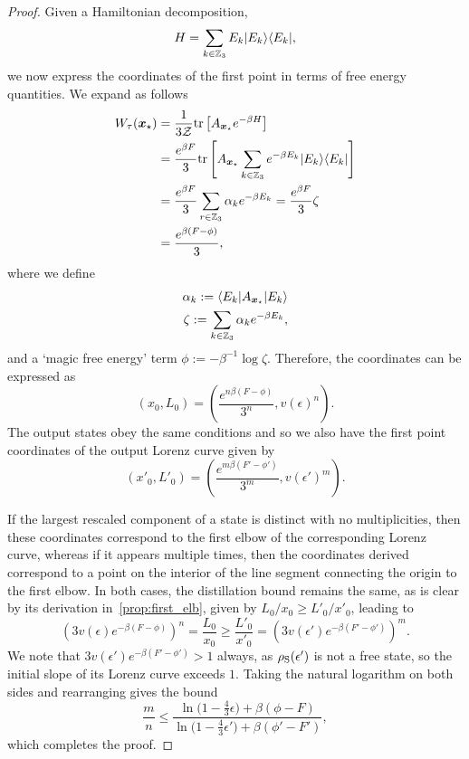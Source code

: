 \documentclass[pra,
aps,
twocolumn,
superscriptaddress,
groupedaddress,
nofootinbib,
reprint
]{revtex4-1}
\begin{document}
\begin{proof}
Given a Hamiltonian decomposition,
\begin{equation}
	H = \sum_{k \in \mathbb{Z}_3} E_k |E_k\rangle\langle E_k|,
\end{equation}
we now express the coordinates of the first point in terms of free energy quantities. We expand as follows
\begin{align}
	W_{\tau}(\boldsymbol{x}_\star) &= \frac{1}{3\mathcal{Z}}\mbox{tr}\left[ A_{\boldsymbol{x}_\star}e^{-\beta H} \right] \nonumber\\
	&= \frac{e^{\beta F}}{3} \mbox{tr}\left[ A_{\boldsymbol{x}_\star}\sum_{k \in \mathbb{Z}_3} e^{-\beta E_k} |E_k\rangle\langle E_k| \right] \\
	&= \frac{e^{\beta F}}{3} \sum_{r \in \mathbb{Z}_3} \alpha_k e^{-\beta E_k}
	= \frac{e^{\beta F}}{3} \zeta \\
	&= \frac{e^{\beta (F - \phi)}}{3},
\end{align}
where we define
\begin{align}
\alpha_k := \langle E_k |A_{\boldsymbol{x}_\star} |E_k\rangle \\
\zeta :=  \sum_{k \in \mathbb{Z}_3} \alpha_k e^{-\beta E_k},
\end{align}
and a `magic free energy' term $\phi := -\beta^{-1} \log \zeta$.
Therefore, the coordinates can be expressed as
\begin{equation}
	(x_0, L_0) = \left( \frac{e^{n\beta (F - \phi)}}{3^n}, v(\epsilon)^n \right).
\end{equation}
The output states obey the same conditions and so we also have the first point coordinates of the output Lorenz curve given by
\begin{equation}
	(x'_0, L'_0) = \left( \frac{e^{m\beta (F' - \phi')}}{3^m}, v(\epsilon')^m \right).
\end{equation}

If the largest rescaled component of a state is distinct with no multiplicities, then these coordinates correspond to the first elbow of the corresponding Lorenz curve, whereas if it appears multiple times, then the coordinates derived correspond to a point on the interior of the line segment connecting the origin to the first elbow.
In both cases, the distillation bound remains the same, as is clear by its derivation in~\cref{prop:first_elb}, given by $L_0/x_0 \geq L'_0/x'_0$, leading to
\begin{equation}
	\left( 3v(\epsilon)e^{-\beta (F - \phi)} \right)^{n} = \frac{L_0}{x_0}
	\geq \frac{L'_0}{x'_0} = \left( 3v(\epsilon')e^{-\beta (F' - \phi')} \right)^{m}.
\end{equation}
We note that $3v(\epsilon')e^{-\beta (F' - \phi')} > 1$ always, as $\rho_{\rm{S}}(\epsilon')$ is not a free state, so the initial slope of its Lorenz curve exceeds $1$.
Taking the natural logarithm on both sides and rearranging gives the bound
\begin{equation}
	\frac{m}{n} \leq \dfrac{\ln{\big( 1-\frac{4}{3}\epsilon \big)} + \beta (\phi - F)}{\ln{\big( 1-\frac{4}{3}\epsilon' \big)} + \beta (\phi' - F')},
\end{equation}
which completes the proof.
\end{proof}
\end{document}
